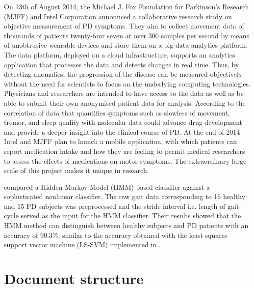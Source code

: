 On 13th of August 2014, the Michael J. Fox Foundation for Parkinson’s Research (MJFF) and Intel Corporation \cite{Intel_2013} announced a collaborative research study on objective measurement of PD symptoms. They aim to collect movement data of thousands of patients twenty-four seven at over 300 samples per second by means of unobtrusive wearable devices and store them on a big data analytics platform. The data platform, deployed on a cloud infrastructure, supports an analytics application that processes the data and detects changes in real time. Thus, by detecting anomalies, the progression of the disease can be measured objectively without the need for scientists to focus on the underlying computing technologies. Physicians and researchers are intended to have access to the data as well as be able to submit their own anonymised patient data for analysis. According to \cite{Intel_2013} the correlation of data that quantifies symptoms such as slowless of movement, tremor, and sleep quality with molecular data could advance drug development and provide a deeper insight into the clinical course of PD. At the end of 2014 Intel and MJFF plan to launch a mobile application, with which patients can report medication intake and how they are feeling to permit medical researchers to assess the effects of medications on motor symptoms. The extraordinary large scale of this project makes it unique in research.

\citeauthor{khorasani_hmm_2014} \cite{khorasani_hmm_2014} compared a Hidden Markov Model (HMM) based classifier against a sophisticated nonlinear classifier. The raw gait data corresponding to 16 healthy and 15 PD subjects was preprocessed and the stride interval i.e. length of gait cycle served as the input for the HMM classifier. Their results showed that the HMM method can distinguish between healthy subjects and PD patients with an accuracy of 90.3\%, similar to the accuracy obtained with the least squares support vector machine (LS-SVM) implemented in \cite{wu_statistical_2010}.

\section{Document structure}

